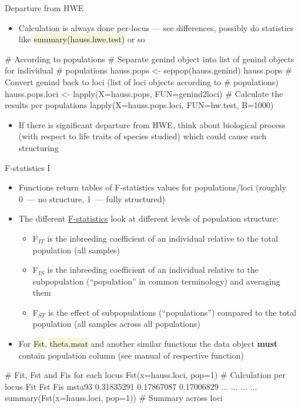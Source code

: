 \documentclass[compress, xelatex, 11pt, xcolor=svgnames, aspectratio=169,
	hyperref={
		bookmarks=true,
		unicode=true,
		colorlinks=true,
		pdftitle={Molecular data in R},
		plainpages=false,
		pdfauthor={Vojtech Zeisek},
		pdfsubject={Course about phylogeny and evolution in R},
		pdfcreator={XeLaTeX},
		pdfkeywords={R, evolution, phylogeny, molecular data},
		linkcolor=Crimson, %
		anchorcolor=Magenta, %
		citecolor=Magenta, %
		filecolor=Magenta, %
		menucolor=Magenta, %
		urlcolor=DodgerBlue, %
		},
	url={hyphens, lowtilde} %
	]{beamer}
\renewcommand{\texttt}[1]{\colorbox{Beige}{{\ttfamily #1}}}
\begin{document}
\begin{frame}[fragile]{Departure from HWE}
	\begin{itemize}
		\item Calculation is always done per-locus --- see differences, possibly do statistics like \texttt{summary(hauss.hwe.test)} or so
	\end{itemize}
	\begin{spluscode}
    # According to populations
    # Separate genind object into list of genind objects for individual
    # populations
    hauss.pops <- seppop(hauss.genind)
    hauss.pops
    # Convert genind back to loci (list of loci objects according to
    # populations)
    hauss.pops.loci <- lapply(X=hauss.pops, FUN=genind2loci)
    # Calculate the results per populations
    lapply(X=hauss.pops.loci, FUN=hw.test, B=1000)
	\end{spluscode}
	\begin{itemize}
		\item If there is significant departure from HWE, think about biological process (with respect to life traits of species studied) which could cause such structuring
	\end{itemize}
\end{frame}

\begin{frame}[fragile]{F-statistics I}
	\begin{itemize}
		\item Functions return tables of F-statistics values for populations/loci (roughly 0~--- no structure, 1~--- fully structured)
		\item The different \href{https://en.wikipedia.org/wiki/F-statistics}{F-statistics} look at different levels of population structure:
		\begin{itemize}
			\item F$_{IT}$ is the inbreeding coefficient of an individual relative to the total population (all samples)
			\item F$_{IS}$ is the inbreeding coefficient of an individual relative to the subpopulation (\enquote{population} in common terminology) and averaging them
			\item F$_{ST}$ is the effect of subpopulations (\enquote{populations}) compared to the total population (all samples across all populations)
		\end{itemize}
		\item For \texttt{Fst}, \texttt{theta.msat} and another similar functions the data object \textbf{must} contain population column (see manual of respective function)
	\end{itemize}
	\begin{spluscode}
    # Fit, Fst and Fis for each locus
    Fst(x=hauss.loci, pop=1) # Calculation per locus
                    Fit        Fst         Fis
    msta93   0.31835291 0.17867087  0.17006829
       ...          ...        ...         ...
    summary(Fst(x=hauss.loci, pop=1)) # Summary across loci
	\end{spluscode}
\end{frame}
\end{document}
